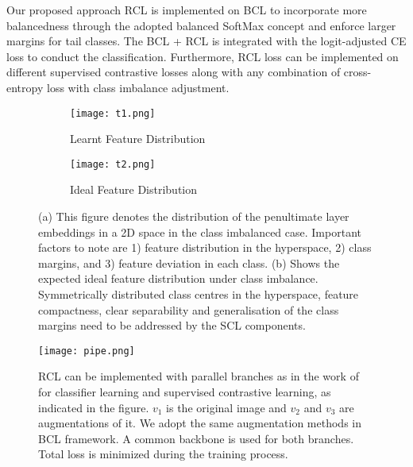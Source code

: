  Our proposed approach RCL is implemented on  BCL to incorporate more balancedness through the adopted balanced SoftMax concept and enforce larger margins for tail classes. The BCL + RCL  is integrated with the logit-adjusted CE loss to conduct the classification. Furthermore, RCL loss can be implemented on different supervised contrastive losses along with any combination of cross-entropy loss with class imbalance adjustment. 

\begin{figure*}[t]
\centering
\hspace{-10mm}
\begin{subfigure}[]{0.45\textwidth}
\texttt{[image: t1.png]}
\caption{ Learnt Feature Distribution }
 \label{cc1}
\end{subfigure}
\begin{subfigure}[]{0.45\textwidth}
\texttt{[image: t2.png]}
\caption{Ideal Feature Distribution }
\label{cc3}
\end{subfigure}

\caption{ (a) This figure denotes the distribution of the penultimate layer embeddings in a 2D space in the class imbalanced 
case. Important factors to note are 1) feature distribution in the hyperspace, 2) class margins, and 3) feature deviation in each 
class. (b) Shows the expected ideal feature distribution under class imbalance. Symmetrically distributed class 
centres in the hyperspace, feature compactness, clear separability and generalisation of the class margins need to be addressed by the SCL components.}

\vspace{-5mm}
\end{figure*}
\begin{figure}[bt]
\centering
  \texttt{[image: pipe.png]}
\caption{RCL can be implemented with parallel branches as in the work of \cite{bcl} for classifier learning and supervised contrastive learning, as indicated in the figure. $v_1$ is the original image and $v_2$ and $v_3$ are augmentations of it. We adopt the same augmentation methods in BCL framework. A common backbone is used for both branches. Total loss is minimized during the training process.}
   \label{pipe}
   \vspace{-5mm}
\end{figure}
